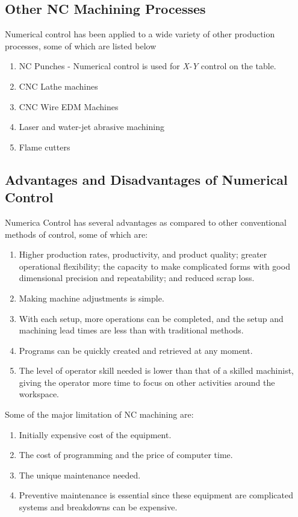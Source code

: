 \subsection{Other NC Machining Processes}
Numerical control has been applied to a wide variety of other production processes\cite{Black2011}, some of which are listed below
\begin{enumerate}
	\item NC Punches - Numerical control is used for \textit{X-Y} control on the table.
	\item CNC Lathe machines
	\item CNC Wire EDM Machines
	\item Laser and water-jet abrasive machining
	\item Flame cutters
\end{enumerate}
\subsection{Advantages and Disadvantages of Numerical Control}
Numerica Control has several advantages as compared to other conventional methods of control\cite{Kalpakjian2010}, some of which are:
\begin{enumerate}
	\item Higher production rates, productivity, and product quality; greater operational flexibility; the capacity to make complicated forms with good dimensional precision and repeatability; and reduced scrap loss.
	\item Making machine adjustments is simple.
	\item With each setup, more operations can be completed, and the setup and machining lead times are less than with traditional methods.
	\item Programs can be quickly created and retrieved at any moment.
	\item The level of operator skill needed is lower than that of a skilled machinist, giving the operator more time to focus on other activities around the workspace.
\end{enumerate}
Some of the major limitation of NC machining are:
\begin{enumerate}
	\item Initially expensive cost of the equipment.
	\item The cost of programming and the price of computer time.
	\item The unique maintenance needed.
	\item Preventive maintenance is essential since these equipment are complicated systems and breakdowns can be expensive.
\end{enumerate}